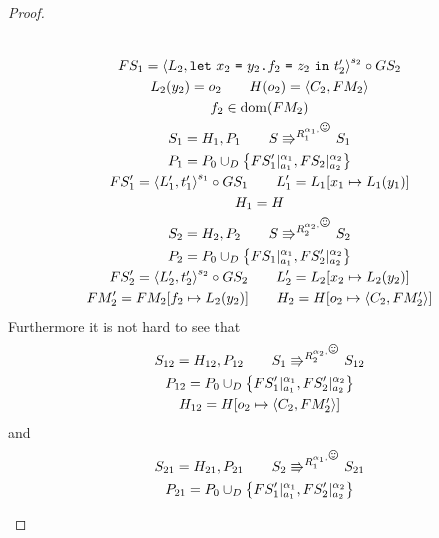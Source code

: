 \begin{proof}
\begin{description}
\begin{equation}
\begin{gathered}
          \\ 
          FS_1 = \xframe{L_2, \Let{x_2}{\FAss{y_2}{f_2}{z_2}}{t'_2}}^{s_2}
          \circ GS_2 \\
          L_2(y_2) = o_2 \andalso H(o_2) = \Obj{C_2, FM_2} \\
          f_2 \in \dom(FM_2) \\
          S_1 = H_1, P_1 \andalso S \Rrightarrow^{R_1^{\alpha_1, \smiley}} S_1
          \\
          P_1 = P_0 \cup_D \left\{ FS'_1|_{a_1}^{\alpha_1},
          FS_2|_{a_2}^{\alpha_2} \right\} \\
          FS'_1 = \xframe{L'_1, t'_1}^{s_1} \circ GS_1  \andalso L'_1 = L_1[x_1 \mapsto
          L_1(y_1)] \\
          H_1 = H
          \\
          S_2 = H_2, P_2 \andalso S \Rrightarrow^{R_2^{\alpha_2, \smiley}} S_2
          \\
          P_2 = P_0 \cup_D \left\{ FS_1|_{a_1}^{\alpha_1},
          FS'_2|_{a_2}^{\alpha_2} \right\} \\
          FS'_2 = \xframe{L'_2, t'_2}^{s_2} \circ GS_2  \andalso L'_2 = L_2[x_2 \mapsto
          L_2(y_2)] \\
          FM'_2 = FM_2[f_2 \mapsto L_2(y_2)] \andalso H_2 = H[o_2 \mapsto
          \Obj{C_2, FM'_2}]
          \\
        \end{gathered}
      \end{equation}
      Furthermore it is not hard to see that 
      \begin{equation}
        \begin{gathered}
          S_{12} = H_{12}, P_{12} \andalso S_1 \Rrightarrow^{R_2^{\alpha_2,
          \smiley}} S_{12}
          \\
          P_{12} = P_0 \cup_D \left\{ FS'_1|_{a_1}^{\alpha_1},
          FS'_2|_{a_2}^{\alpha_2} \right\} \\
          H_{12} = H[o_2 \mapsto \Obj{C_2, FM'_2}]
        \end{gathered}
      \end{equation}
      and 
      \begin{equation}
        \begin{gathered}
          S_{21} = H_{21}, P_{21} \andalso S_2 \Rrightarrow^{R_1^{\alpha_1,
          \smiley}} S_{21}
          \\
          P_{21} = P_0 \cup_D \left\{ FS'_1|_{a_1}^{\alpha_1},
          FS'_2|_{a_2}^{\alpha_2} \right\} \\

\end{gathered}
\end{equation}
\end{description}
\end{proof}
